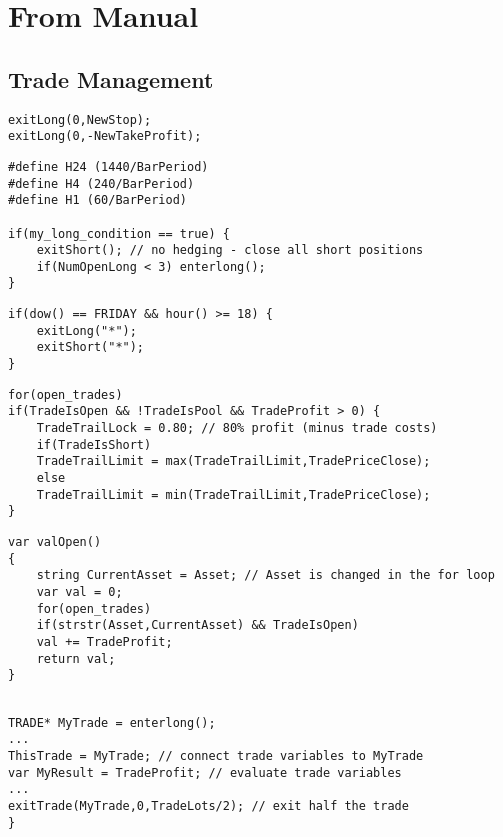 \section{From Manual}
\subsection{Trade Management}
\begin{lstlisting}[caption=
Chan1ge stops and profit targets of all open long trades with the current algo and asset]
exitLong(0,NewStop);
exitLong(0,-NewTakeProfit);
\end{lstlisting}


\begin{lstlisting}[caption=Limit the number of open positions
// max. 3 open long positions per asset/algo]
#define H24 (1440/BarPeriod)
#define H4 (240/BarPeriod)
#define H1 (60/BarPeriod)

if(my_long_condition == true) {
	exitShort(); // no hedging - close all short positions
	if(NumOpenLong < 3) enterlong();
}
\end{lstlisting}

\begin{lstlisting}[caption=Exit all open trades Friday afternoon GMT]
if(dow() == FRIDAY && hour() >= 18) { 
	exitLong("*");
	exitShort("*");
}
\end{lstlisting}


\begin{lstlisting}[caption=Lock 80\% profit of all winning trades]
for(open_trades)
if(TradeIsOpen && !TradeIsPool && TradeProfit > 0) {
	TradeTrailLock = 0.80; // 80% profit (minus trade costs)
	if(TradeIsShort)
	TradeTrailLimit = max(TradeTrailLimit,TradePriceClose);
	else
	TradeTrailLimit = min(TradeTrailLimit,TradePriceClose);
}
\end{lstlisting}


\begin{lstlisting}[caption=Calculate the value of all open trades with the current asset]
var valOpen()
{
	string CurrentAsset = Asset; // Asset is changed in the for loop
	var val = 0;
	for(open_trades)
	if(strstr(Asset,CurrentAsset) && TradeIsOpen)
	val += TradeProfit;
	return val;
}
\end{lstlisting}

\begin{lstlisting}[caption=Monitoring and modifying a certain trade]

TRADE* MyTrade = enterlong();
...
ThisTrade = MyTrade; // connect trade variables to MyTrade
var MyResult = TradeProfit; // evaluate trade variables
...
exitTrade(MyTrade,0,TradeLots/2); // exit half the trade
} 
\end{lstlisting}


